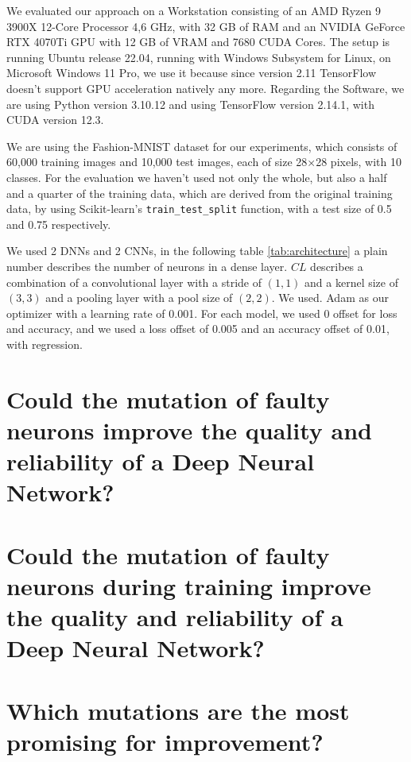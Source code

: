 We evaluated our approach on a Workstation consisting of an AMD Ryzen 9 3900X 12-Core Processor 4,6 GHz, with 32 GB of RAM and an NVIDIA GeForce RTX 4070Ti GPU with 12 GB of VRAM and 7680 CUDA Cores.
The setup is running Ubuntu release 22.04, running with Windows Subsystem for Linux, on Microsoft Windows 11 Pro, we use it because since version 2.11\cite{noauthor_build_2023} TensorFlow doesn't support GPU acceleration natively any more.
Regarding the Software, we are using Python version 3.10.12 and using TensorFlow version 2.14.1, with CUDA version 12.3.

We are using the Fashion-MNIST dataset\cite{xiao_fashion-mnist_2017} for our experiments, which consists of 60,000 training images and 10,000 test images, each of size 28×28 pixels, with 10 classes.
For the evaluation we haven't used not only the whole, but also a half and a quarter of the training data, which are derived from the original training data, by using Scikit-learn's\cite{pedregosa_scikit-learn_2011} \texttt{train\_test\_split} function, with a test size of 0.5 and 0.75 respectively.

We used 2 DNNs and 2 CNNs, in the following table \ref{tab:architecture} a plain number describes the number of neurons in a dense layer. $CL$ describes a combination of a convolutional layer with a stride of $(1,1)$ and a kernel size of $(3,3)$ and a pooling layer with a pool size of $(2,2)$. We used.
Adam as our optimizer with a learning rate of 0.001.
For each model, we used 0 offset for loss and accuracy, and we used a loss offset of 0.005 and an accuracy offset of 0.01, with regression.


\section{Could the mutation of faulty neurons improve the quality and reliability of a Deep Neural Network?}\label{sec:could-the-mutation-of-faulty-neurons-improve-the-quality-and-reliability-of-a-deep-neural-network?}
\section{Could the mutation of faulty neurons during training improve the quality and reliability of a Deep Neural Network?}\label{sec:could-the-mutation-of-faulty-neurons-during-training-improve-the-quality-and-reliability-of-a-deep-neural-network?}
\section{Which mutations are the most promising for improvement?}\label{sec:which-mutations-are-the-most-promising-for-improvement?}
